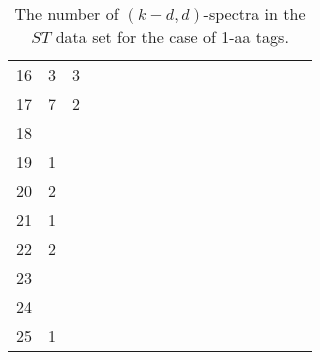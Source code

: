 \documentclass{article}
\begin{document}
\begin{table}[h]
{\begin{tabular}{|c|c|
c|c|c|c|c|c|c|c|c|c|c|c|c|c|c|}
16  & 3 & 3 &  &  &  &  &  &  &  &  &  &  &  &  &  & \\

17  & 7 & 2 &  &  &  &  &  &  &  &  &  &  &  &  &  & \\

18  &  &  &  &  &  &  &  &  &  &  &  &  &  &  &  & \\

19  & 1 &  &  &  &  &  &  &  &  &  &  &  &  &  &  & \\

20  & 2 &  &  &  &  &  &  &  &  &  &  &  &  &  &  & \\

21  & 1 &  &  &  &  &  &  &  &  &  &  &  &  &  &  & \\

22  & 2 &  &  &  &  &  &  &  &  &  &  &  &  &  &  & \\

23  &  &  &  &  &  &  &  &  &  &  &  &  &  &  &  & \\

24  &  &  &  &  &  &  &  &  &  &  &  &  &  &  &  & \\

25  & 1 &  &  &  &  &  &  &  &  &  &  &  &  &  &  & \\

  \hline
\end{tabular}
\par}
\centering
\caption{The number of $(k-d,d)$-spectra in the $ST$ data set for the case of 1-aa tags.}
\vspace{3mm}
\label{table:kd-1-ST}
\end{table}
\end{document}
